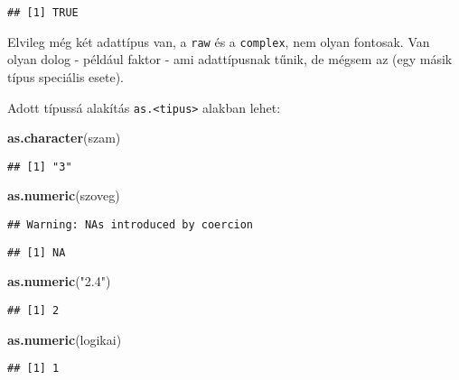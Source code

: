 \documentclass[]{book}
\newenvironment{Shaded}{\begin{snugshade}}{\end{snugshade}}
\newcommand{\KeywordTok}[1]{\textcolor[rgb]{0.13,0.29,0.53}{\textbf{#1}}}
\newcommand{\NormalTok}[1]{#1}
\newcommand{\StringTok}[1]{\textcolor[rgb]{0.31,0.60,0.02}{#1}}
\begin{document}
\begin{verbatim}
## [1] TRUE
\end{verbatim}

Elvileg még két adattípus van, a \texttt{raw} és a \texttt{complex}, nem olyan fontosak. Van olyan dolog - például faktor - ami adattípusnak tűnik, de mégsem az (egy másik típus speciális esete).

Adott típussá alakítás \texttt{as.\textless{}tipus\textgreater{}} alakban lehet:

\begin{Shaded}
\begin{Highlighting}[]
\KeywordTok{as.character}\NormalTok{(szam)}
\end{Highlighting}
\end{Shaded}

\begin{verbatim}
## [1] "3"
\end{verbatim}

\begin{Shaded}
\begin{Highlighting}[]
\KeywordTok{as.numeric}\NormalTok{(szoveg)}
\end{Highlighting}
\end{Shaded}

\begin{verbatim}
## Warning: NAs introduced by coercion
\end{verbatim}

\begin{verbatim}
## [1] NA
\end{verbatim}

\begin{Shaded}
\begin{Highlighting}[]
\KeywordTok{as.numeric}\NormalTok{(}\StringTok{"2.4"}\NormalTok{)}
\end{Highlighting}
\end{Shaded}

\begin{verbatim}
## [1] 2
\end{verbatim}

\begin{Shaded}
\begin{Highlighting}[]
\KeywordTok{as.numeric}\NormalTok{(logikai)}
\end{Highlighting}
\end{Shaded}

\begin{verbatim}
## [1] 1
\end{verbatim}
\end{document}

